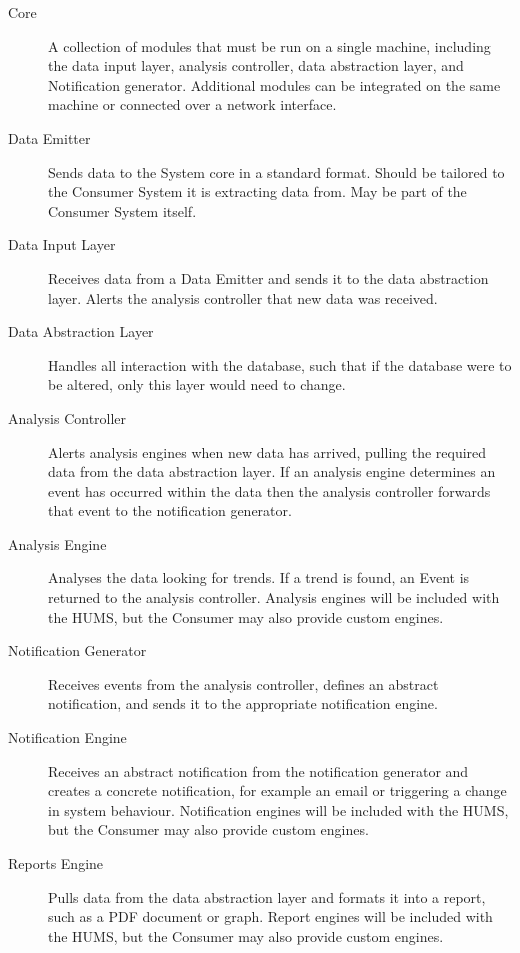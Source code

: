 \documentclass[10pt,a4paper]{article}
\begin{document}
\begin{description}
  \item[Core] A collection of modules that must be run on a single machine, including the data input layer, analysis controller, data abstraction layer, and Notification generator. Additional modules can be integrated on the same machine or connected over a network interface.

  \item[Data Emitter] Sends data to the System core in a standard
    format. Should be tailored to the Consumer System it is extracting data
    from. May be part of the Consumer System itself.

  \item[Data Input Layer] Receives data from a Data Emitter and sends
    it to the data abstraction layer. Alerts the analysis controller
    that new data was received.

  \item[Data Abstraction Layer] Handles all interaction with the
    database, such that if the database were to be altered, only this
    layer would need to change.

  \item[Analysis Controller] Alerts analysis engines when new data
    has arrived, pulling the required data from the data abstraction
    layer. If an analysis engine determines an event has occurred
    within the data then the analysis controller forwards that event
    to the notification generator.

  \item[Analysis Engine] Analyses the data looking for trends. If a
    trend is found, an Event is returned to the analysis
    controller. Analysis engines will be included with the HUMS, but the
    Consumer may also provide custom engines.

  \item[Notification Generator] Receives events from the analysis
    controller, defines an abstract notification, and sends it to the
    appropriate notification engine.

  \item[Notification Engine] Receives an abstract notification from
    the notification generator and creates a concrete notification,
    for example an email or triggering a change in system
    behaviour. Notification engines will be included with the HUMS, but the
    Consumer may also provide custom engines.

  \item[Reports Engine] Pulls data from the data abstraction layer and
    formats it into a report, such as a PDF document or graph. Report
    engines will be included with the HUMS, but the Consumer may also provide
    custom engines.
\end{description}
\end{document}
